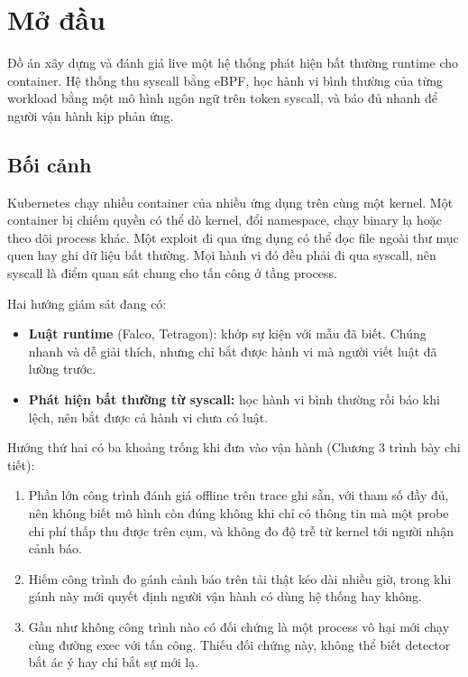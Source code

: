 \chapter{Mở đầu}

Đồ án xây dựng và đánh giá live một hệ thống phát hiện bất thường runtime cho container. Hệ thống thu syscall bằng eBPF, học hành vi bình thường của từng workload bằng một mô hình ngôn ngữ trên token syscall, và báo đủ nhanh để người vận hành kịp phản ứng.

\section{Bối cảnh}

Kubernetes chạy nhiều container của nhiều ứng dụng trên cùng một kernel. Một container bị chiếm quyền có thể dò kernel, đổi namespace, chạy binary lạ hoặc theo dõi process khác. Một exploit đi qua ứng dụng có thể đọc file ngoài thư mục quen hay ghi dữ liệu bất thường. Mọi hành vi đó đều phải đi qua syscall, nên syscall là điểm quan sát chung cho tấn công ở tầng process.

Hai hướng giám sát đang có:

\begin{itemize}
\tightlist
\item
  \textbf{Luật runtime} (Falco, Tetragon): khớp sự kiện với mẫu đã biết. Chúng nhanh và dễ giải thích, nhưng chỉ bắt được hành vi mà người viết luật đã lường trước.
\item
  \textbf{Phát hiện bất thường từ syscall:} học hành vi bình thường rồi báo khi lệch, nên bắt được cả hành vi chưa có luật.
\end{itemize}

Hướng thứ hai có ba khoảng trống khi đưa vào vận hành (Chương 3 trình bày chi tiết):

\begin{enumerate}
\def\labelenumi{\arabic{enumi}.}
\tightlist
\item
  Phần lớn công trình đánh giá offline trên trace ghi sẵn, với tham số đầy đủ, nên không biết mô hình còn đúng không khi chỉ có thông tin mà một probe chi phí thấp thu được trên cụm, và không đo độ trễ từ kernel tới người nhận cảnh báo.
\item
  Hiếm công trình đo gánh cảnh báo trên tải thật kéo dài nhiều giờ, trong khi gánh này mới quyết định người vận hành có dùng hệ thống hay không.
\item
  Gần như không công trình nào có đối chứng là một process vô hại mới chạy cùng đường exec với tấn công. Thiếu đối chứng này, không thể biết detector bắt ác ý hay chỉ bắt sự mới lạ.
\end{enumerate}

